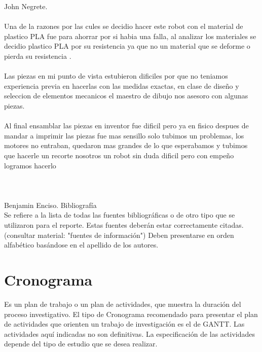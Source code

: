 \documentclass[12pt,letterpaper]{article}
\begin{document}
John Negrete.
\\\\
Una de la razones por las cules se decidio hacer este robot con el material de plastico PLA fue para ahorrar por si habia una falla, al analizar los materiales se decidio plastico PLA por su resistencia ya que no un material que se deforme o pierda su resistencia .
\\\\
Las piezas en mi punto de vista  estubieron  dificiles por que no teniamos experiencia previa en hacerlas con las medidas exactas, en clase de diseño y seleccion de elementos mecanicos el maestro de dibujo nos asesoro con algunas piezas.
\\\\
Al final ensamblar las piezas en inventor fue dificil pero ya en fisico despues de mandar a imprimir las piezas fue mas sensillo solo tubimos un problemas, los motores no entraban, quedaron mas grandes de lo que esperabamos y tubimos que hacerle un recorte nosotros un robot sin duda dificil pero con empeño logramos hacerlo 
\\\\\\\\
Benjamin Enciso.
\newpage
Bibliografía
\\
Se refiere a la lista de todas las fuentes bibliográficas o de otro tipo que se utilizaron para el reporte. Estas fuentes deberán estar correctamente citadas. (consultar material: "fuentes de información")
Deben presentarse en orden alfabético basándose en el apellido de los autores.  

\newpage
 \section*{Cronograma}
  
\begin{flushleft}
Es un plan de trabajo o un plan de actividades, que muestra la duración del proceso investigativo. El tipo de Cronograma recomendado para presentar el plan de actividades que orienten un trabajo de investigación es el de GANTT. Las actividades aquí indicadas no son definitivas. La especificación de las actividades depende del tipo de estudio que se desea realizar.
\end{flushleft}
\end{document}
